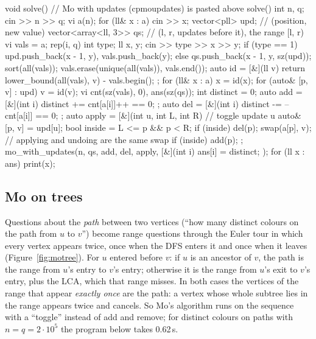 \begin{code}
void solve() {  // Mo with updates (cpmoupdates) is pasted above solve()
    int n, q;
    cin >> n >> q;
    vi a(n);
    for (ll& x : a) cin >> x;
    vector<pll> upd;  // (position, new value)
    vector<array<ll, 3>> qs;  // (l, r, updates before it), the range [l, r)
    vi vals = a;
    rep(i, q) {
        int type;
        ll x, y;
        cin >> type >> x >> y;
        if (type == 1) upd.push_back({x - 1, y}), vals.push_back(y);
        else qs.push_back({x - 1, y, sz(upd)});
    }
    sort(all(vals));
    vals.erase(unique(all(vals)), vals.end());
    auto id = [&](ll v) { return lower_bound(all(vals), v) - vals.begin(); };
    for (ll& x : a) x = id(x);
    for (auto& [p, v] : upd) v = id(v);
    vi cnt(sz(vals), 0), ans(sz(qs));
    int distinct = 0;
    auto add = [&](int i) { distinct += cnt[a[i]]++ == 0; };
    auto del = [&](int i) { distinct -= --cnt[a[i]] == 0; };
    auto apply = [&](int u, int L, int R) {  // toggle update u
        auto& [p, v] = upd[u];
        bool inside = L <= p && p < R;
        if (inside) del(p);
        swap(a[p], v);  // applying and undoing are the same swap
        if (inside) add(p);
    };
    mo_with_updates(n, qs, add, del, apply, [&](int i) { ans[i] = distinct; });
    for (ll x : ans) print(x);
}
\end{code}


\subsection{Mo on trees}

Questions about the \emph{path} between two vertices (``how many distinct colours on the path from $u$ to $v$'') become range questions
through the Euler tour in which every vertex appears twice, once when the DFS enters it and once when it leaves
(Figure~\ref{fig:motree}). For $u$ entered before $v$: if $u$ is an ancestor of $v$, the path is the range from $u$'s entry to $v$'s
entry; otherwise it is the range from $u$'s exit to $v$'s entry, plus the LCA, which that range misses. In both cases the vertices of
the range that appear \emph{exactly once} are the path: a vertex whose whole subtree lies in the range appears twice and cancels.
So Mo's algorithm runs on the sequence with a ``toggle'' instead of add and remove; for distinct colours on paths with $n = q = 2
\cdot 10^5$ the program below takes 0.62\,s.

